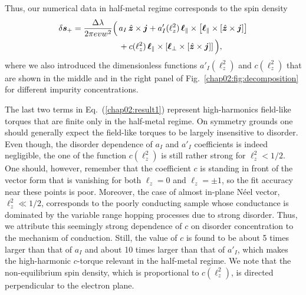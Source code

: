 Thus, our numerical data in half-metal regime corresponds to the spin density
\begin{align}
\label{chap02:result1}
\delta\boldsymbol{s}_+= \frac{\Delta\lambda}{2\pi evw^2}
\Big(\,&a_I\,\hat{\boldsymbol{z}}\times \boldsymbol{j} + a'_I(\ell_z^2)\,\boldsymbol{\ell}_\parallel\times \left[\boldsymbol{\ell}_\parallel\times \left[\hat{\boldsymbol{z}}\times\boldsymbol{j}\right]\right]\nonumber\\
&+c(\ell_z^2)\,\boldsymbol{\ell}_\parallel\times \left[\boldsymbol{\ell}_\perp\times \left[\hat{\boldsymbol{z}}\times\boldsymbol{j}\right]\right]\Big),
\end{align}
where we also introduced the dimensionless functions $a'_I(\ell_z^2)$ and $c(\ell_z^2)$ that are shown in the middle and in the right panel of Fig.~\ref{chap02:fig:decomposition} for different impurity concentrations. 

The last two terms in Eq.~(\ref{chap02:result1}) represent high-harmonics field-like torques that are finite only in the half-metal regime. On symmetry grounds one should generally expect the field-like torques to be largely insensitive to disorder. Even though, the disorder dependence of $a_I$ and $a'_I$ coefficients is indeed negligible, the one of the function $c(\ell_z^2)$ is still rather strong for $\ell_z^2<1/2$. One should, however, remember that the coefficient $c$ is standing in front of the vector form that is vanishing for both $\ell_z=0$ and $\ell_z=\pm 1$, so the fit accuracy near these points is poor. Moreover, the case of almost in-plane N\'eel vector, $\ell_z^2\ll 1/2$, corresponds to the poorly conducting sample whose conductance is dominated by the variable range hopping processes due to strong disorder. Thus, we attribute this seemingly strong dependence of $c$ on disorder concentration to the mechanism of conduction. Still, the value of $c$ is found to be about 5 times larger than that of $a_I$ and about 10 times larger than that of $a'_I$, which makes the high-harmonic $c$-torque relevant in the half-metal regime. We note that the non-equilibrium spin density, which is proportional to $c(\ell_z^2)$, is directed perpendicular to the electron plane.  

